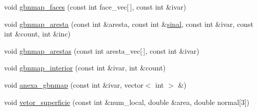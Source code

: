 \begin{DoxyCompactItemize}
\item 
void \hyperlink{classPhElem_ad355231f4e2807541c62212647c44b3e}{gbnmap\+\_\+faces} (const int face\+\_\+vec\mbox{[}$\,$\mbox{]}, const int \&ivar)
\item 
void \hyperlink{classPhElem_a19299ae55f9faef322a1d21d7e9b2a88}{gbnmap\+\_\+aresta} (const int \&aresta, const int \&\hyperlink{classPhElem_a4034b9b2a458d1277ca74e4e8a49627e}{sinal}, const int \&ivar, const int \&count, int \&inc)
\item 
void \hyperlink{classPhElem_af545eccd164b2fc7ca104afff13a50c6}{gbnmap\+\_\+arestas} (const int aresta\+\_\+vec\mbox{[}$\,$\mbox{]}, const int \&ivar)
\item 
void \hyperlink{classPhElem_ae6f35113c182e2678646552e6c4a752c}{gbnmap\+\_\+interior} (const int \&ivar, int \&count)
\item 
void \hyperlink{classPhElem_a4da3f8bc24014789f4685c9a611a11dc}{anexa\+\_\+gbnmap} (const int \&ivar, vector$<$ int $>$ \&)
\item 
void \hyperlink{classPhElem_a993d5f1b66f6d99ffb95adc9ff882e80}{vetor\+\_\+superficie} (const int \&num\+\_\+local, double \&area, double normal\mbox{[}3\mbox{]})
\end{DoxyCompactItemize}
